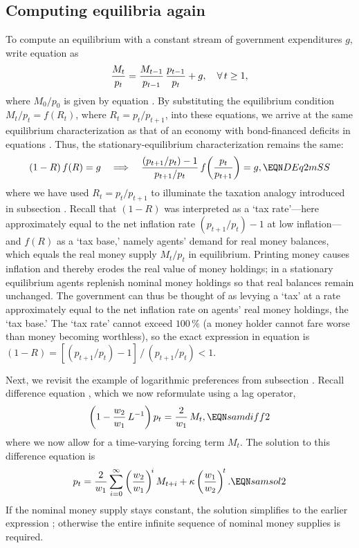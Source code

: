\subsection{Computing equilibria again}\label{sec:DefMnonstat}%
To compute an equilibrium with a constant stream of government
expenditures $g$, write equation  as
$$
  {M_t \over p_t} = {M_{t-1} \over p_{t-1}}\,{p_{t-1} \over p_t}
     + g, \quad \forall\, t \geq 1,
$$
where ${M_0 / p_0}$ is given by equation .
By substituting the equilibrium condition $M_t / p_t = f(R_t)$, where
$R_t = p_t / p_{t+1}$, into these equations, we arrive at the same
equilibrium characterization as that of an economy with bond-financed
deficits in equations .
Thus, the stationary-equilibrium characterization  remains
the same:
$$
  (1-R)\,f(R) = g \quad \Longrightarrow \quad
  {(p_{t+1}/p_t) - 1 \over p_{t+1}/p_t}\,
        f\!\left({p_t \over p_{t+1}}\right) = g,
  \EQN DEq2mSS
$$
where we have used $R_t = p_t / p_{t+1}$ to illuminate the taxation
analogy introduced in subsection .
Recall that $(1-R)$ was interpreted as a `tax rate'---here
approximately equal to the net inflation rate $(p_{t+1}/p_t) - 1$
at low inflation---and $f(R)$ as a `tax base,' namely agents'
demand for real money balances, which equals the real money supply
$M_t/p_t$ in equilibrium.
Printing money causes inflation and thereby erodes the real value of
money holdings; in a stationary equilibrium agents replenish nominal
money holdings so that real balances remain unchanged.
The government can thus be thought of as levying a `tax' at a rate
approximately equal to the net inflation rate on agents' real money
holdings, the `tax base.'
The `tax rate' cannot exceed $100\,\%$ (a money holder cannot fare
worse than money becoming worthless), so the exact expression in
equation  is
$(1-R) = [(p_{t+1}/p_t) - 1]\,/\,(p_{t+1}/p_t) < 1$.

Next, we revisit the example of logarithmic preferences from
subsection .
Recall difference equation , which we now reformulate
using a lag operator,
$$
  \left(1 - {w_2 \over w_1}\,L^{-1}\right) p_t
       = {2 \over w_1}\,M_t,
  \EQN samdiff2
$$
where we now allow for a time-varying forcing term $M_t$.
The solution to this difference equation is
$$
  p_t = {2 \over w_1} \sum_{i=0}^{\infty}
             \left({w_2 \over w_1}\right)^{\!i} M_{t+i}
       + \kappa \left({w_1 \over w_2}\right)^{\!t}.
  \EQN samsol2
$$
If the nominal money supply stays constant, the solution simplifies
to the earlier expression ; otherwise the entire
infinite sequence of nominal money supplies is required.

